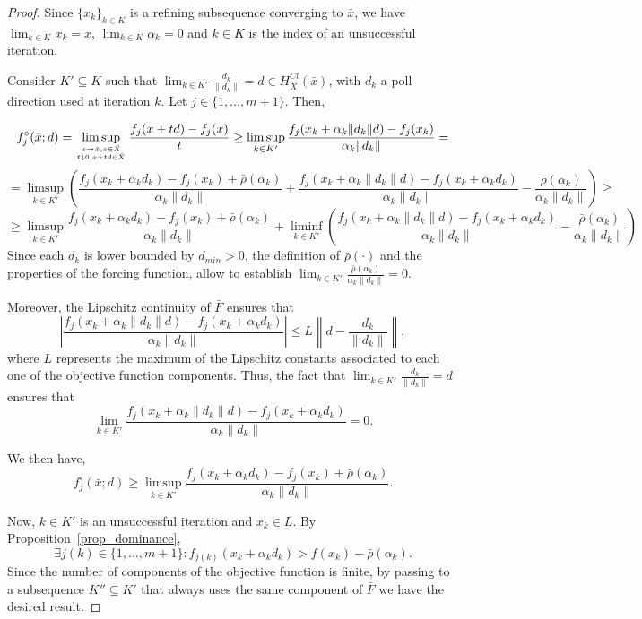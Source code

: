 \documentclass[10pt,a4paper]{amsart}
\begin{document}
\begin{proof}
Since $\{x_k\}_{k\in K}$ is a refining subsequence converging to
$\bar{x}$, we have $\lim_{k\in K}x_k=\bar{x}$, $\lim_{k\in
K}\alpha_k=0$ and $k\in K$ is the index of an unsuccessful
iteration.

Consider $K'\subseteq K$ such that $\lim_{k\in
K'}\frac{d_k}{\|d_k\|}=d\in H_{\bar{X}}^{Cl}(\bar{x})$, with $d_k$
a poll direction used at iteration $k$. Let
$j\in\{1,\ldots,m+1\}$. Then,

\begin{equation*}
f_{j}^\circ (\bar{x};d) =\limsup_{x\rightarrow \bar{x}, x \in
\bar{X} \atop t \downarrow 0, x+t d \in \bar{X}} \dfrac{f_{j}(x+t
d)-f_{j}(x)}{t}\geq\limsup_{k\in K'}
\dfrac{f_j(x_k+\alpha_k\|d_k\|d)-f_j(x_k)}{\alpha_k\|d_k\|}=
\end{equation*}
\begin{equation*}
=\limsup_{k\in K'}\left( \dfrac{f_j(x_k+\alpha_k
d_k)-f_j(x_k)+\bar{\rho}(\alpha_k)}{\alpha_k\|d_k\|}+
\dfrac{f_j(x_k+\alpha_k \|d_k\|d)-f_j(x_k+\alpha_k
d_k)}{\alpha_k\|d_k\|}-\frac{\bar{\rho}(\alpha_k)}{\alpha_k\|d_k\|}\right)\geq
\end{equation*}
\begin{equation*}
\geq\limsup_{k\in K'} \dfrac{f_j(x_k+\alpha_k
d_k)-f_j(x_k)+\bar{\rho}(\alpha_k)}{\alpha_k\|d_k\|}+\liminf_{k\in
K'}\left( \dfrac{f_j(x_k+\alpha_k \|d_k\|d)-f_j(x_k+\alpha_k
d_k)}{\alpha_k\|d_k\|}-\frac{\bar{\rho}(\alpha_k)}{\alpha_k\|d_k\|}\right)
\end{equation*}
Since each $d_k$ is lower bounded by $d_{min}>0$, the definition
of $\bar{\rho}(\cdot)$ and the properties of the forcing function,
allow to establish $\lim_{k\in
K'}\frac{\bar{\rho}(\alpha_k)}{\alpha_k\|d_k\|}=0$.

Moreover, the Lipschitz continuity of $\bar{F}$ ensures that
$$\left|\dfrac{f_j(x_k+\alpha_k \|d_k\|d)-f_j(x_k+\alpha_k
d_k)}{\alpha_k\|d_k\|}\right|\leq
L\left\|d-\frac{d_k}{\|d_k\|}\right\|,$$ where $L$ represents the
maximum of the Lipschitz constants associated to each one of the
objective function components. Thus, the fact that $\lim_{k\in
K'}\frac{d_k}{\|d_k\|}=d$ ensures that
$$\lim_{k\in K'}\dfrac{f_j(x_k+\alpha_k \|d_k\|d)-f_j(x_k+\alpha_k
d_k)}{\alpha_k\|d_k\|}=0.$$

We then have,
$$f_{j}^\circ (\bar{x};d)\geq \limsup_{k\in K'} \dfrac{f_j(x_k+\alpha_k
d_k)-f_j(x_k)+\bar{\rho}(\alpha_k)}{\alpha_k\|d_k\|}.$$

Now, $k\in K'$ is an unsuccessful iteration and $x_k\in L$. By
Proposition~\ref{prop_dominance},
\begin{equation}\label{ineq}\exists j(k)\in\{1,\ldots,m+1\}:f_{j(k)}(x_k+\alpha_k d_k)>f(x_k)-\bar{\rho}(\alpha_k).\end{equation}
Since the number of components of the objective function is
finite, by passing to a subsequence $K''\subseteq K'$ that always
uses the same component of $\bar{F}$ we have the desired result.
\end{proof}
\end{document}
